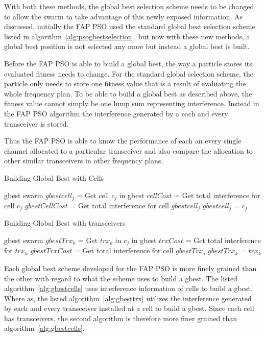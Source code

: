 With both these methods, the global best selection scheme needs to be changed to allow the swarm to take advantage of this newly exposed information. As discussed, initially the FAP PSO used the standard global best selection scheme listed in algorithm~\ref{alg:psogbestselection}, but now with these new methods, a global best position is not selected any more but instead a global best is built.

Before the FAP PSO is able to build a global best, the way a particle stores its evaluated fitness needs to change. For the standard global selection scheme, the particle only needs to store one fitness value that is a result of evaluating the whole frequency plan. To be able to build a global best as described above, the fitness value cannot simply be one lump sum representing interference. Instead in the FAP PSO algorithm the interference generated by a each and every transceiver is stored.

Thus the FAP PSO is able to know the performance of each an every single channel allocated to a particular transceiver and also compare the allocation to other similar transceivers in other frequency plans.

\begin{algorithm}
\caption{Building Global Best with Cells}
\label{alg:gbestcells}
\begin{algorithmic}[1]
\REQUIRE gbest
\REQUIRE swarm
		\STATE $gbestcell_j$ = Get cell $c_j$ in gbest
		\STATE $cellCost$ = Get total interference for cell $c_j$
		\STATE $gbestCellCost$ = Get total interference for cell $gbestcell_j$
			\STATE $gbestcell_j$ = $c_j$
		\ENDIF
	\ENDFOR
\ENDFOR
\end{algorithmic}
\end{algorithm}

\begin{algorithm}
\caption{Building Global Best with transceivers}
\label{alg:gbesttrx}
\begin{algorithmic}[1]
\REQUIRE gbest
\REQUIRE swarm
			\STATE $gbestTrx_k$ = Get $trx_k$ in $c_j$ in gbest
			\STATE $trxCost$ = Get total interference for $trx_k$
			\STATE $gbestTrxCost$ = Get total interference for cell $gbestTrx_j$
				\STATE $gbestTrx_k$ = $trx_k$
			\ENDIF
		\ENDFOR
	\ENDFOR
\ENDFOR
\end{algorithmic}
\end{algorithm}
Each global best scheme developed for the FAP PSO is more finely grained than the other with regard to what the scheme uses to build a gbest. The listed algorithm~\ref{alg:gbestcells} uses interference information of cells to build a gbest. Where as, the listed algorithm~\ref{alg:gbesttrx} utilizes the interference generated by each and every transceiver installed at a cell to build a gbest. Since each cell has transceivers, the second algorithm is therefore more finer grained than algorithm~\ref{alg:gbestcells}.

